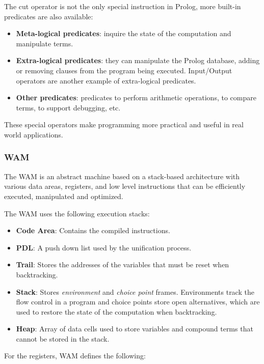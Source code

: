 The cut operator is not the only special instruction in Prolog, more built-in predicates are also available:

\begin{itemize}
  \item \textbf{Meta-logical predicates}: inquire the state of the computation and manipulate terms.
  \item \textbf{Extra-logical predicates}: they can manipulate the Prolog database, adding or removing clauses from
  the program being executed. Input/Output operators are another example of extra-logical predicates.
  \item \textbf{Other predicates}: predicates to perform arithmetic operations, to compare terms, to support debugging, etc.
\end{itemize}

These special operators make programming more practical and useful in real world applications.

\subsubsection{WAM}

The WAM is an abstract machine based on a stack-based architecture with various data areas, registers, and low level instructions
that can be efficiently executed, manipulated and optimized.

The WAM uses the following execution stacks:

\begin{itemize}
  \item \textbf{Code Area}: Contains the compiled instructions.
  \item \textbf{PDL}: A push down list used by the unification process.
  \item \textbf{Trail}: Stores the addresses of the variables that must be reset when backtracking.
  \item \textbf{Stack}: Stores \textit{environment} and \textit{choice point} frames. Environments track the flow control in a program
  and choice points store open alternatives, which are used to restore the state of the computation when backtracking.
  \item \textbf{Heap}: Array of data cells used to store variables and compound terms that cannot
  be stored in the stack.
\end{itemize}

For the registers, WAM defines the following:

